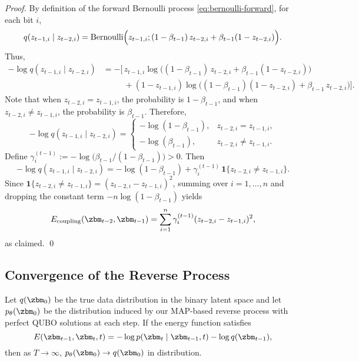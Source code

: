 \documentclass[11pt,letterpaper]{article}
\begin{document}
\begin{proof}
By definition of the forward Bernoulli process \eqref{eq:bernoulli-forward}, for each bit $i$,
\begin{equation*}
q(z_{t-1,i}\mid z_{t-2,i}) 
= \mathrm{Bernoulli}\Bigl(z_{t-1,i}; (1-\beta_{t-1})\,z_{t-2,i} + \beta_{t-1}(1-z_{t-2,i})\Bigr).
\end{equation*}
Thus,
\begin{align*}
-\log q(z_{t-1,i}\mid z_{t-2,i}) 
&= -\bigl[\,z_{t-1,i}\log\bigl((1-\beta_{t-1})\,z_{t-2,i} + \beta_{t-1}(1-z_{t-2,i})\bigr) \\
&\qquad\;\; + (1-z_{t-1,i})\log\bigl((1-\beta_{t-1})(1-z_{t-2,i}) + \beta_{t-1}\,z_{t-2,i}\bigr)\bigr].
\end{align*}
Note that when $z_{t-2,i} = z_{t-1,i}$, the probability is $1-\beta_{t-1}$, and when $z_{t-2,i} \neq z_{t-1,i}$, the probability is $\beta_{t-1}$. Therefore,
\[
-\log q(z_{t-1,i}\mid z_{t-2,i}) 
= 
\begin{cases}
-\log(1-\beta_{t-1}), & z_{t-2,i} = z_{t-1,i},\\
-\log(\beta_{t-1}), & z_{t-2,i} \neq z_{t-1,i}.
\end{cases}
\]
Define $\gamma_i^{(t-1)} := -\log\!\bigl(\beta_{t-1} / (1-\beta_{t-1})\bigr) > 0$. Then
\[
-\log q(z_{t-1,i}\mid z_{t-2,i}) 
= -\log(1-\beta_{t-1}) 
+ \gamma_i^{(t-1)} \, \mathbf{1}\{z_{t-2,i} \neq z_{t-1,i}\}.
\]
Since $\mathbf{1}\{z_{t-2,i} \neq z_{t-1,i}\} = (z_{t-2,i} - z_{t-1,i})^2$, summing over $i=1,\ldots,n$ and dropping the constant term $-n\log(1-\beta_{t-1})$ yields
\[
E_{\text{coupling}}(\zbm_{t-2}, \zbm_{t-1}) 
= \sum_{i=1}^n \gamma_i^{(t-1)} (z_{t-2,i} - z_{t-1,i})^2,
\]
as claimed.
\qed
\end{proof}

\subsection{Convergence of the Reverse Process}
\label{subsec:reverse-convergence}

\begin{theorem}
\label{thm:reverse-convergence}
Let $q(\zbm_0)$ be the true data distribution in the binary latent space and let $p_\theta(\zbm_0)$ be the distribution induced by our MAP-based reverse process with perfect QUBO solutions at each step. If the energy function satisfies
\[
E(\zbm_{t-1}, \zbm_t, t) = -\log p(\zbm_t \mid \zbm_{t-1}, t) - \log q(\zbm_{t-1}),
\]
then as $T \to \infty$, $p_\theta(\zbm_0) \to q(\zbm_0)$ in distribution.
\end{theorem}
\end{document}
